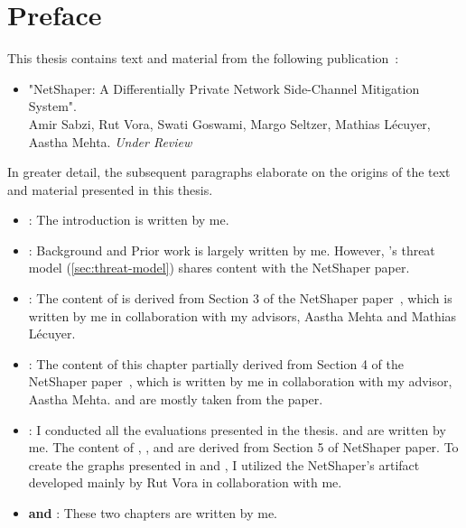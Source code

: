 
\chapter{Preface}

This thesis contains text and material from the following publication~\cite{netshaper}:
\begin{itemize}
  \item "NetShaper: A Differentially Private Network Side-Channel Mitigation System".
  \\
  Amir Sabzi, Rut Vora, Swati Goswami, Margo Seltzer, Mathias Lécuyer, Aastha Mehta. \textit{Under Review}
\end{itemize}
In greater detail, the subsequent paragraphs elaborate on the origins of the text and material presented in this thesis.
\begin{itemize}
  \item \textbf{}: The introduction is written by me. 
  \item \textbf{}: Background and Prior work is largely written by me. However, {\sys}'s threat model (\ref{sec:threat-model}) shares content with the NetShaper paper.
  \item \textbf{}: The content of  is derived from Section 3 of the NetShaper paper~\cite{netshaper}, which is written by me in collaboration with my advisors, Aastha Mehta and Mathias L\'{e}cuyer. 
  \item \textbf{}: The content of this chapter partially derived from Section 4 of the NetShaper paper~\cite{netshaper}, which is written by me in collaboration with my advisor, Aastha Mehta.  and  are mostly taken from the paper.
  \item \textbf{}: I conducted all the evaluations presented in the thesis.
   and  are written by me. The content of , , and  are derived from Section 5 of NetShaper paper.
  To create the graphs presented in  and , I utilized the NetShaper's artifact developed mainly by Rut Vora in collaboration with me.
 
  \item \textbf{ and }: These two chapters are written by me.




\end{itemize}